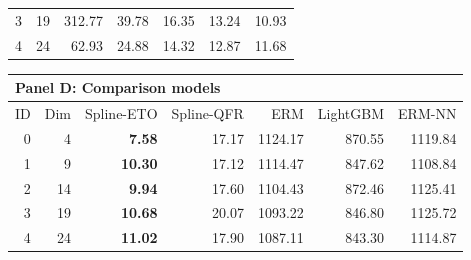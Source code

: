 \begin{table}[htbp]
\begin{tabular}{rrrrrrr}
3 & 19 & 312.77 & 39.78 & 16.35 & 13.24 & 10.93 \\
4 & 24 & 62.93 & 24.88 & 14.32 & 12.87 & 11.68 \\
\bottomrule
\end{tabular}
\par\medskip
\begin{tabular}{rrrrrrr}
\toprule
\multicolumn{7}{l}{\textbf{Panel D: Comparison models}} \\
\midrule
ID & Dim & Spline-ETO & Spline-QFR & ERM & LightGBM & ERM-NN \\
\midrule
0 & 4 & \textbf{7.58} & 17.17 & 1124.17 & 870.55 & 1119.84 \\
1 & 9 & \textbf{10.30} & 17.12 & 1114.47 & 847.62 & 1108.84 \\
2 & 14 & \textbf{9.94} & 17.60 & 1104.43 & 872.46 & 1125.41 \\
3 & 19 & \textbf{10.68} & 20.07 & 1093.22 & 846.80 & 1125.72 \\
4 & 24 & \textbf{11.02} & 17.90 & 1087.11 & 843.30 & 1114.87 \\
\bottomrule
\end{tabular}
\end{table}
